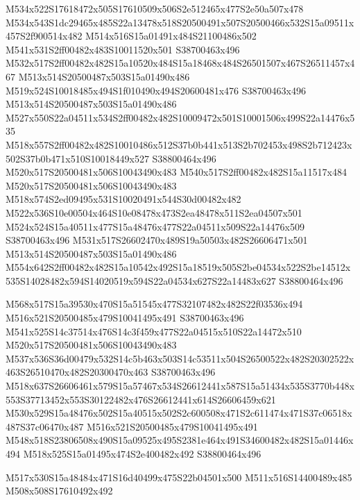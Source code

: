 \documentclass{article}
\begin{document}
\begin{multicols}{2}
M534x522S17618472x505S17610509x506S2e512465x477S2e50a507x478 M534x543S1dc29465x485S22a13478x518S20500491x507S20500466x532S15a09511x457S2f900514x482 M514x516S15a01491x484S21100486x502 M541x531S2ff00482x483S10011520x501 S38700463x496 M532x517S2ff00482x482S15a10520x484S15a18468x484S26501507x467S26511457x467 M513x514S20500487x503S15a01490x486 M519x524S10018485x494S1f010490x494S20600481x476 S38700463x496 M513x514S20500487x503S15a01490x486 M527x550S22a04511x534S2ff00482x482S10009472x501S10001506x499S22a14476x535 M518x557S2ff00482x482S10010486x512S37b0b441x513S2b702453x498S2b712423x502S37b0b471x510S10018449x527 S38800464x496 M520x517S20500481x506S10043490x483 M540x517S2ff00482x482S15a11517x484 M520x517S20500481x506S10043490x483 M518x574S2ed09495x531S10020491x544S30d00482x482 M522x536S10e00504x464S10e08478x473S2ea48478x511S2ea04507x501 M524x524S15a40511x477S15a48476x477S22a04511x509S22a14476x509 S38700463x496 M531x517S26602470x489S19a50503x482S26606471x501 M513x514S20500487x503S15a01490x486 M554x642S2ff00482x482S15a10542x492S15a18519x505S2be04534x522S2be14512x535S14028482x594S14020519x594S22a04534x627S22a14483x627 S38800464x496

M568x517S15a39530x470S15a51545x477S32107482x482S22f03536x494 M516x521S20500485x479S10041495x491 S38700463x496 M541x525S14c37514x476S14c3f459x477S22a04515x510S22a14472x510 M520x517S20500481x506S10043490x483 M537x536S36d00479x532S14c5b463x503S14c53511x504S26500522x482S20302522x463S26510470x482S20300470x463 S38700463x496 M518x637S26606461x579S15a57467x534S26612441x587S15a51434x535S3770b448x553S37713452x553S30122482x476S26612441x614S26606459x621 M530x529S15a48476x502S15a40515x502S2c600508x471S2c611474x471S37c06518x487S37c06470x487 M516x521S20500485x479S10041495x491 M548x518S23806508x490S15a09525x495S2381e464x491S34600482x482S15a01446x494 M518x525S15a01495x474S2e400482x492 S38800464x496

\begin{center}
M517x530S15a48484x471S16d40499x475S22b04501x500 M511x516S14400489x485 M508x508S17610492x492 
\end{center}





\end{multicols}
\end{document}
